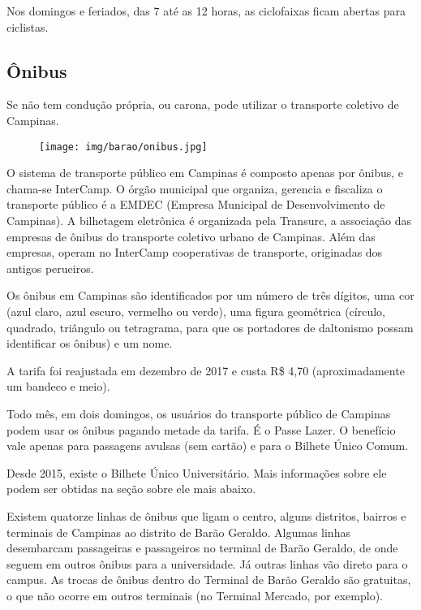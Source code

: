 Nos domingos e feriados, das 7 até as 12 horas, as ciclofaixas ficam abertas
para ciclistas.

\subsection{Ônibus}

Se não tem condução própria, ou carona, pode utilizar o transporte coletivo de
Campinas.

\begin{figure}[h!]
  \centering
  \texttt{[image: img/barao/onibus.jpg]}
\end{figure}

O sistema de transporte público em Campinas é composto apenas por ônibus, e
chama-se InterCamp. O órgão municipal que organiza, gerencia e fiscaliza o
transporte público é a EMDEC (Empresa Municipal de Desenvolvimento de
Campinas). A bilhetagem eletrônica é organizada pela Transurc, a associação das
empresas de ônibus do transporte coletivo urbano de Campinas. Além das
empresas, operam no InterCamp cooperativas de transporte, originadas dos
antigos perueiros.

Os ônibus em Campinas são identificados por um número de três dígitos, uma cor
(azul claro, azul escuro, vermelho ou verde), uma figura geométrica (círculo,
quadrado, triângulo ou tetragrama, para que os portadores de daltonismo possam
identificar os ônibus) e um nome.

A tarifa foi reajustada em dezembro de 2017 e custa R\$ 4,70 (aproximadamente
um bandeco e meio).

Todo mês, em dois domingos, os usuários do transporte público de Campinas podem
usar os ônibus pagando metade da tarifa. É o Passe Lazer. O benefício vale
apenas para passagens avulsas (sem cartão) e para o Bilhete Único Comum.

Desde 2015, existe o Bilhete Único Universitário. Mais informações sobre ele
podem ser obtidas na seção sobre ele mais abaixo.

Existem quatorze linhas de ônibus que ligam o centro, alguns distritos, bairros
e terminais de Campinas ao distrito de Barão Geraldo. Algumas linhas
desembarcam passageiras e passageiros no terminal de Barão Geraldo, de onde
seguem em outros ônibus para a universidade. Já outras linhas vão direto para o
campus. As trocas de ônibus dentro do Terminal de Barão Geraldo são gratuitas,
o que não ocorre em outros terminais (no Terminal Mercado, por exemplo).

